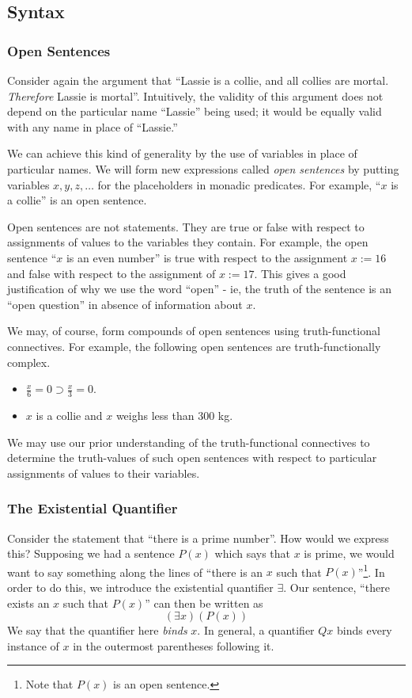 \subsection{Syntax}

\subsubsection*{Open Sentences}
Consider again the argument that ``Lassie is a collie, and all collies are mortal. \emph{Therefore} Lassie is mortal''. Intuitively, the validity of this argument does not depend on the particular name ``Lassie'' being used; it would be equally valid with any name in place of ``Lassie.'' 

We can achieve this kind of generality by the use of variables in place of particular names. We will form new expressions called \emph{ open sentences} by putting variables $x,y,z,\dots$ for the placeholders in monadic predicates. For example, ``$x$ is a collie'' is an open sentence.

Open sentences are not statements. They are true or false with respect to assignments of values to the variables they contain. For example, the open sentence ``$x$ is an even number'' is true with respect to the assignment $x := 16$ and false with respect to the assignment of $x := 17$. This gives a good justification of why we use the word ``open'' - ie, the truth of the sentence is an ``open question'' in absence of information about $x$. 

We may, of course, form compounds of open sentences using truth-functional connectives. For example, the following open sentences are truth-functionally complex.
\begin{itemize}
\item $\frac{x}{6} = 0 \supset \frac{x}{3} = 0$.
\item $x$ is a collie and $x$ weighs less than 300 kg. 
\end{itemize}
We may use our prior understanding of the truth-functional connectives to determine the truth-values of such open sentences with respect to particular assignments of values to their variables.  



\subsubsection*{The Existential Quantifier}
Consider the statement that ``there is a prime number''. How would we express this? Supposing we had a sentence $P(x)$ which says that $x$ is prime, we would want to say something along the lines of ``there is an $x$ such that $P(x)$''\footnote{Note that $P(x)$ is an open sentence.}. In order to do this, we introduce the existential quantifier $\exists$. Our sentence, ``there exists an $x$ such that $P(x)$'' can then be written as 
\[
    (\exists x)(P(x))
\]
We say that the quantifier here \emph{binds} $x$. In general, a quantifier $Qx$ binds every instance of $x$ in the outermost parentheses following it. 

